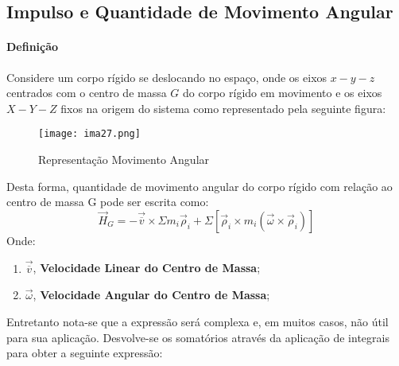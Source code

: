\documentclass{article}
\begin{document}
\newpage

        \subsection{Impulso e Quantidade de Movimento Angular}
            \paragraph{Definição}Considere um corpo rígido se deslocando no espaço, onde os eixos $x-y-z$ centrados com o centro de massa $G$ do corpo rígido em movimento e os eixos $X-Y-Z$ fixos na origem do sistema como representado pela seguinte figura:
                \begin{figure}[H]
                    \centering
                    \texttt{[image: ima27.png]}
                    \caption{Representação Movimento Angular}
                \end{figure}\noindent
            Desta forma, quantidade de movimento angular do corpo rígido com relação ao centro de massa G pode ser escrita como:
                \begin{equation}
                    \boxed{
                        \vec{H}_{G} = 
                        -\vec{\overline{v}}\times\Sigma m_{i}\vec{\rho}_{i} + 
                        \Sigma
                        \left[
                            \vec{\rho}_{i}\times m_{i} (\vec{\omega}\times\vec{\rho}_{i})
                        \right]
                    }
                \end{equation}
            Onde:
                \begin{enumerate}[rightmargin = \leftmargin, noitemsep]
                    \item $\vec{\overline{v}}$, \textbf{Velocidade Linear do Centro de Massa};
                    \item $\vec{\omega}$, \textbf{Velocidade Angular do Centro de Massa};
                \end{enumerate}
            Entretanto nota-se que a expressão será complexa e, em muitos casos, não útil para sua aplicação. Desvolve-se os somatórios através da aplicação de integrais para obter a seguinte expressão:
\end{document}
